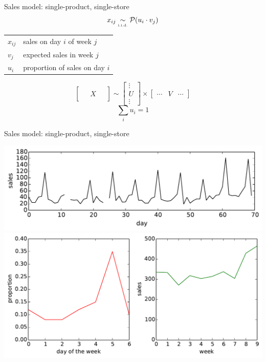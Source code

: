 \documentclass{beamer}
\begin{document}
\begin{frame}{Sales model: single-product, single-store}
 \begin{equation}
  x_{ij} \underset{\text{\tiny i.i.d.}}{\sim} \mathcal{P}(u_i \cdot v_j)
 \end{equation}
 \begin{tabular}{ll}
  $x_{ij}$ & sales on day $i$ of week $j$ \\
  $v_j$    & expected sales in week $j$ \\
  $u_i$    & proportion of sales on day $i$
 \end{tabular}
 \begin{equation}
  \begin{bmatrix} \; & & \; \\ & X & \\ & & \end{bmatrix} \sim \begin{bmatrix} \vdots \\ U \\ \vdots \end{bmatrix} \times \begin{bmatrix} \cdots & V & \cdots \end{bmatrix}
 \end{equation}
 \begin{equation}
  \sum_i u_i = 1
 \end{equation}
\end{frame}

\begin{frame}{Sales model: single-product, single-store}
 \begin{center}
  \includegraphics[width=0.8\columnwidth]{fast_seller_small.pdf} \\
  \includegraphics[width=0.8\columnwidth]{fast_factorisation.pdf}
 \end{center}
\end{frame}
\end{document}

